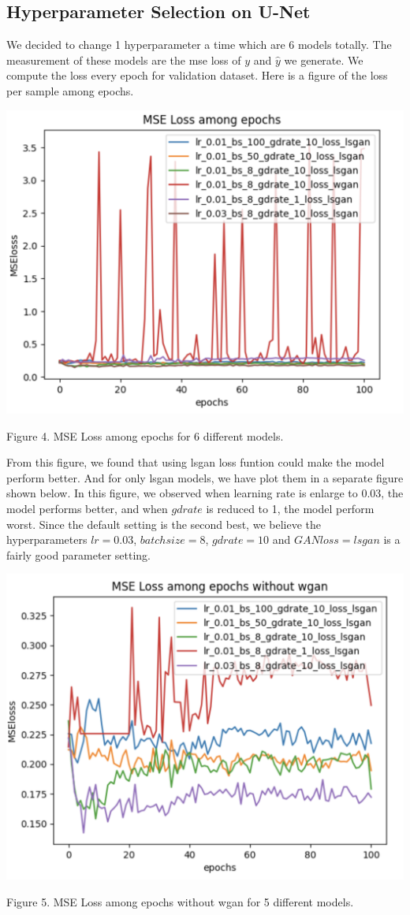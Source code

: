 \documentclass[letterpaper]{article}
\begin{document}
\subsection{Hyperparameter Selection on U-Net}
We decided to change 1 hyperparameter a time which are 6 models totally. The measurement of these models are the mse loss of $y$ and $\hat{y}$ we generate. We compute the loss every epoch for validation dataset. Here is a figure of the loss per sample among epochs.

\begin{center}
    \includegraphics[width=.5\textwidth]{./update-figs/MSE loss among epochs.png}

    Figure 4. MSE Loss among epochs for 6 different models.
\end{center}

From this figure, we found that using lsgan loss funtion could make the model perform better. And for only lsgan models, we have plot them in a separate figure shown below. In this figure, we observed when learning rate is enlarge to 0.03, the model performs better, and when $gdrate$ is reduced to 1, the model perform worst. Since the default setting is the second best, we believe the hyperparameters $lr=0.03$, $batchsize=8$, $gdrate=10$ and $GAN loss=lsgan$ is a fairly good parameter setting.

\begin{center}
    \includegraphics[width=.5\textwidth]{./update-figs/MSE loss among epochs without wgan.png}

    Figure 5. MSE Loss among epochs without wgan for 5 different models.
\end{center}
\end{document}
